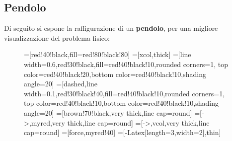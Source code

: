 \documentclass[a4paper]{extarticle}
\begin{document}
\vspace{1em}
\subsection{Pendolo}
Di seguito si espone la raffigurazione di un \textbf{pendolo}, per una migliore visualizzazione del problema fisico:

\begin{figure}[H]
  \centering
  =[red!40!black,fill=red!80!black!80]
  =[xcol,thick]
  =[line width=0.6,red!30!black,fill=red!40!black!10,rounded corners=1,
                    top color=red!40!black!20,bottom color=red!40!black!10,shading angle=20]
  =[dashed,line width=0.1,red!30!black!40,fill=red!40!black!10,rounded corners=1,
                          top color=red!40!black!10,bottom color=red!40!black!10,shading angle=20]
  =[brown!70!black,very thick,line cap=round]
  \def\rope#1{ \draw[black,line width=1.4] #1; \draw[rope,line width=1.1] #1; }
  =[->,myred,very thick,line cap=round]
  =[->,vcol,very thick,line cap=round]
  =[force,myred!40]
  =[-{Latex[length=3,width=2]},thin]
  \def\tick#1#2{\draw[thick] (#1)++(#2:0.12) --++ (#2-180:0.24)}


\end{figure}
\end{document}
